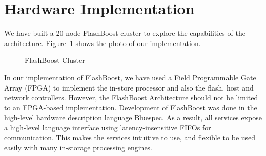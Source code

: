 \section{Hardware Implementation}
\label{sec:implementation}

We have built a 20-node FlashBoost cluster to explore the capabilities of the
architecture. Figure~\ref{fig:bluedbmcluster} shows the photo of our
implementation.


\begin{figure}[ht!]
	\centering
	\caption{FlashBoost Cluster}
	\label{fig:bluedbmcluster}
\end{figure}

In our implementation of FlashBoost, we have used a Field Programmable Gate
Array (FPGA) to implement the in-store processor and also the flash, host and
network controllers. However, the FlashBoost Architecture should not be limited
to an FPGA-based implementation.  Development of FlashBoost was done in the
high-level hardware description language Bluespec. As a result, all services
expose a high-level language interface using latency-insensitive FIFOs for
communication. This makes the services intuitive to use, and flexible to be used
easily with many in-storage processing engines.

